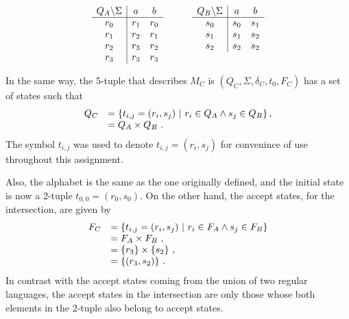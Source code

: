 \begin{solution}
\begin{equation*}
\begin{array}{c c}
\begin{array}[t]{c | c c}
                Q_A \backslash \Sigma & a & b \\
                \hline
                r_0 & r_1 & r_0 \\
                r_1 & r_2 & r_1 \\
                r_2 & r_3 & r_2 \\
                r_3 & r_3 & r_3
            \end{array} \quad & \quad 
            \begin{array}[t]{c | c c}
                Q_B \backslash \Sigma & a & b \\
                \hline
                s_0 & s_0 & s_1 \\
                s_1 & s_1 & s_2 \\
                s_2 & s_2 & s_2
            \end{array}
        \end{array}
    \end{equation*}

    In the same way, the 5-tuple that describes $M_C$ is $(Q_C, \Sigma, \delta_C, t_0, F_C)$ has a set of states such that
    \begin{equation*}
        \begin{array}{l l}
            Q_C & = \left\{t_{i,j} = (r_i, s_j)\ |\ r_i \in Q_A \land s_j \in Q_B\right\}, \\
            & = Q_A \times Q_B\ . \\
        \end{array}
    \end{equation*}
    The symbol $t_{i,j}$ was used to denote $t_{i,j} = (r_i, s_j)$ for convenince of use throughout this assignment.

    Also, the alphabet is the same as the one originally defined, and the initial state is now a 2-tuple $t_{0,0} = (r_0, s_0)$. On the other hand, the accept states, for the intersection, are given by
    \begin{equation*}
        \begin{array}{l l}
            F_C & = \left\{t_{i,j} = (r_i, s_j)\ |\ r_i \in F_A \land s_j \in F_B\right\} \\
            & = F_A \times F_B\ , \\
            & = \{r_3\} \times \{s_2\}\ , \\
            & = \{(r_3, s_2)\}\ .
        \end{array}
    \end{equation*}
    In contrast with the accept states coming from the union of two regular languages, the accept states in the intersection are only those whose both elements in the 2-tuple also belong to accept states.


\end{solution}
